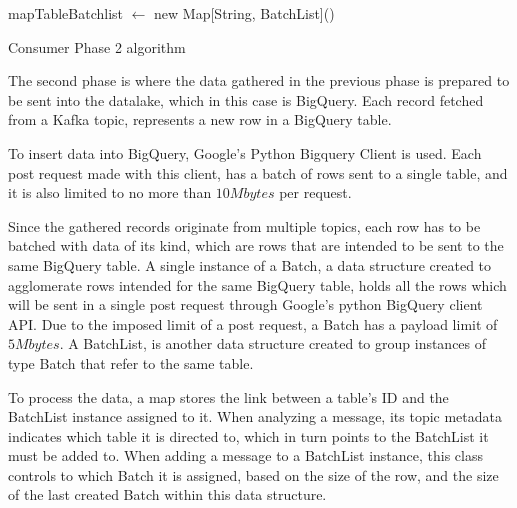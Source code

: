 \IncMargin{1em} 
\begin{algorithm}[h]
    \BlankLine

    mapTableBatchlist $\leftarrow$ new Map[String, BatchList]()\; 
\caption{Consumer Phase 2 algorithm}
\label{algo:phase_2} 
\end{algorithm} 
\DecMargin{1em}

The second phase is where the data gathered in the previous phase is prepared to
be sent into the datalake, which in this case is BigQuery. Each record fetched
from a Kafka topic, represents a new row in a BigQuery table. 

To insert data into BigQuery, Google's Python Bigquery Client is used. Each post
request made with this client, has a batch of rows sent to a single table, and
it is also limited to no more than $10Mbytes$ per request.

Since the gathered records originate from multiple topics, each row has to be
batched with data of its kind, which are rows that are intended to be sent to
the same BigQuery table.  A single instance of a Batch, a data structure created
to agglomerate rows intended for the same BigQuery table, holds all the rows
which will be sent in a single post request through Google's python BigQuery
client API. Due to the imposed limit of a post request, a Batch has a payload
limit of $5 Mbytes$.  A BatchList, is another data structure created to group
instances of type Batch that refer to the same table.

To process the data, a map stores the link between a table's ID and the
BatchList instance assigned to it. When analyzing a message, its topic metadata
indicates which table it is directed to, which in turn points to the BatchList
it must be added to.  When adding a message to a BatchList instance, this class
controls to which Batch it is assigned, based on the size of the row, and the
size of the last created Batch within this data structure.

